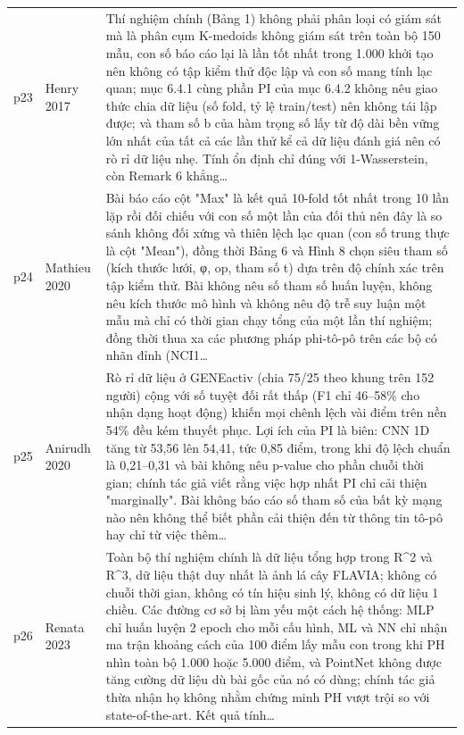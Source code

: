 \begin{longtable}{@{}L{1.05cm} L{3.2cm} L{10.1cm}@{}}
p23 & {\scriptsize Henry 2017} & {\scriptsize Thí nghiệm chính (Bảng 1) không phải phân loại có giám sát mà là phân cụm K-medoids không giám sát trên toàn bộ 150 mẫu, con số báo cáo lại là lần tốt nhất trong 1.000 khởi tạo nên không có tập kiểm thử độc lập và con số mang tính lạc quan; mục 6.4.1 cùng phần PI của mục 6.4.2 không nêu giao thức chia dữ liệu (số fold, tỷ lệ train/test) nên không tái lập được; và tham số b của hàm trọng số lấy từ độ dài bền vững lớn nhất của tất cả các lần thử kể cả dữ liệu đánh giá nên có rò rỉ dữ liệu nhẹ. Tính ổn định chỉ đúng với 1-Wasserstein, còn Remark 6 khẳng…} \\[2pt]
p24 & {\scriptsize Mathieu 2020} & {\scriptsize Bài báo cáo cột "Max" là kết quả 10-fold tốt nhất trong 10 lần lặp rồi đối chiếu với con số một lần của đối thủ nên đây là so sánh không đối xứng và thiên lệch lạc quan (con số trung thực là cột "Mean"), đồng thời Bảng 6 và Hình 8 chọn siêu tham số (kích thước lưới, φ, op, tham số t) dựa trên độ chính xác trên tập kiểm thử. Bài không nêu số tham số huấn luyện, không nêu kích thước mô hình và không nêu độ trễ suy luận một mẫu mà chỉ có thời gian chạy tổng của một lần thí nghiệm; đồng thời thua xa các phương pháp phi-tô-pô trên các bộ có nhãn đỉnh (NCI1…} \\[2pt]
p25 & {\scriptsize Anirudh 2020} & {\scriptsize Rò rỉ dữ liệu ở GENEactiv (chia 75/25 theo khung trên 152 người) cộng với số tuyệt đối rất thấp (F1 chỉ 46–58\% cho nhận dạng hoạt động) khiến mọi chênh lệch vài điểm trên nền 54\% đều kém thuyết phục. Lợi ích của PI là biên: CNN 1D tăng từ 53,56 lên 54,41, tức 0,85 điểm, trong khi độ lệch chuẩn là 0,21–0,31 và bài không nêu p-value cho phần chuỗi thời gian; chính tác giả viết rằng việc hợp nhất PI chỉ cải thiện "marginally". Bài không báo cáo số tham số của bất kỳ mạng nào nên không thể biết phần cải thiện đến từ thông tin tô-pô hay chỉ từ việc thêm…} \\[2pt]
p26 & {\scriptsize Renata 2023} & {\scriptsize Toàn bộ thí nghiệm chính là dữ liệu tổng hợp trong R\textasciicircum{}2 và R\textasciicircum{}3, dữ liệu thật duy nhất là ảnh lá cây FLAVIA; không có chuỗi thời gian, không có tín hiệu sinh lý, không có dữ liệu 1 chiều. Các đường cơ sở bị làm yếu một cách hệ thống: MLP chỉ huấn luyện 2 epoch cho mỗi cấu hình, ML và NN chỉ nhận ma trận khoảng cách của 100 điểm lấy mẫu con trong khi PH nhìn toàn bộ 1.000 hoặc 5.000 điểm, và PointNet không được tăng cường dữ liệu dù bài gốc của nó có dùng; chính tác giả thừa nhận họ không nhằm chứng minh PH vượt trội so với state-of-the-art. Kết quả tính…} \\[2pt]

\end{longtable}
